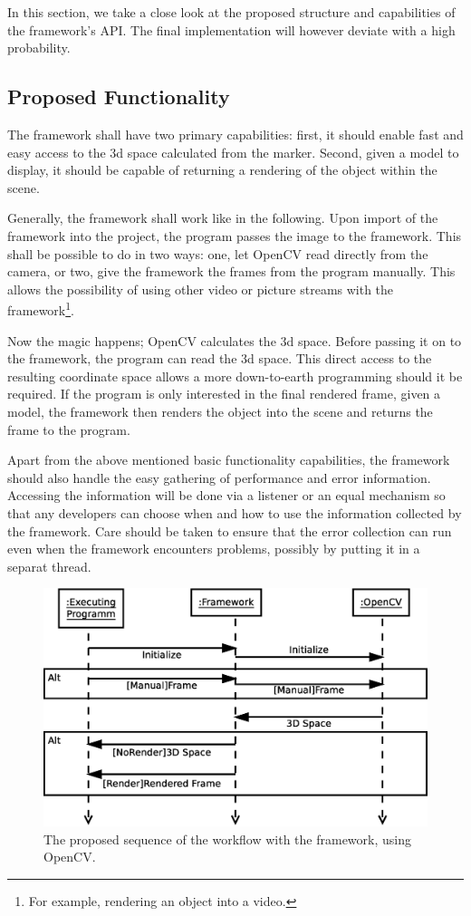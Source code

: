 In this section, we take a close look at the proposed structure and capabilities of the framework's API.
The final implementation will however deviate with a high probability.

\subsection{Proposed Functionality}

The framework shall have two primary capabilities: first, it should enable fast and easy access to the 3d space calculated from the marker.
Second, given a model to display, it should be capable of returning a rendering of the object within the scene.

Generally, the framework shall work like in the following.
Upon import of the framework into the project, the program passes the image to the framework.
This shall be possible to do in two ways: one, let OpenCV read directly from the camera, or two, give the framework the frames from the program manually.
This allows the possibility of using other video or picture streams with the framework\footnote{For example, rendering an object into a video.}.

Now the magic happens; OpenCV calculates the 3d space.
Before passing it on to the framework, the program can read the 3d space.
This direct access to the resulting coordinate space allows a more down-to-earth programming should it be required.
If the program is only interested in the final rendered frame, given a model, the framework then renders the object into the scene and returns the frame to the program.

Apart from the above mentioned basic functionality capabilities, the framework should also handle the easy gathering of performance and error information.
Accessing the information will be done via a listener or an equal mechanism so that any developers can choose when and how to use the information collected by the framework.
Care should be taken to ensure that the error collection can run even when the framework encounters problems, possibly by putting it in a separat thread.

\begin{figure}
	\centering
	\includegraphics[width=12cm]{images/sequence_access.eps}
	\caption[Access Sequence.]{The proposed sequence of the workflow with the framework, using OpenCV.}
	\label{fig:sequence_access}
\end{figure}

